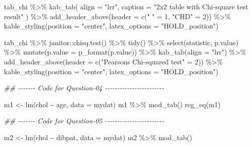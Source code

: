 \documentclass[
  12pt,
  oneside]{article}
\newenvironment{Shaded}{}{}
\newcommand{\AttributeTok}[1]{\textcolor[rgb]{0.49,0.56,0.16}{#1}}
\newcommand{\DecValTok}[1]{\textcolor[rgb]{0.25,0.63,0.44}{#1}}
\newcommand{\DocumentationTok}[1]{\textcolor[rgb]{0.73,0.13,0.13}{\textit{#1}}}
\newcommand{\FunctionTok}[1]{\textcolor[rgb]{0.02,0.16,0.49}{#1}}
\newcommand{\NormalTok}[1]{#1}
\newcommand{\OtherTok}[1]{\textcolor[rgb]{0.00,0.44,0.13}{#1}}
\newcommand{\SpecialCharTok}[1]{\textcolor[rgb]{0.25,0.44,0.63}{#1}}
\newcommand{\StringTok}[1]{\textcolor[rgb]{0.25,0.44,0.63}{#1}}
\begin{document}
\begin{Shaded}
\begin{Highlighting}[]
\NormalTok{tab\_chi }\SpecialCharTok{\%\textgreater{}\%} 
  \FunctionTok{kab\_tab}\NormalTok{(}
    \AttributeTok{align =} \StringTok{"lrr"}\NormalTok{,}
    \AttributeTok{caption =} \StringTok{"2x2 table with Chi{-}square test result"}      
\NormalTok{    ) }\SpecialCharTok{\%\textgreater{}\%} 
  \FunctionTok{add\_header\_above}\NormalTok{(}\AttributeTok{header =} \FunctionTok{c}\NormalTok{(}\StringTok{" "} \OtherTok{=} \DecValTok{1}\NormalTok{, }\StringTok{"CHD"} \OtherTok{=} \DecValTok{2}\NormalTok{)) }\SpecialCharTok{\%\textgreater{}\%} 
  \FunctionTok{kable\_styling}\NormalTok{(}\AttributeTok{position =} \StringTok{"center"}\NormalTok{, }\AttributeTok{latex\_options =} \StringTok{"HOLD\_position"}\NormalTok{)}

\NormalTok{tab\_chi }\SpecialCharTok{\%\textgreater{}\%}\NormalTok{ janitor}\SpecialCharTok{::}\FunctionTok{chisq.test}\NormalTok{() }\SpecialCharTok{\%\textgreater{}\%} 
  \FunctionTok{tidy}\NormalTok{() }\SpecialCharTok{\%\textgreater{}\%} 
  \FunctionTok{select}\NormalTok{(statistic, p.value) }\SpecialCharTok{\%\textgreater{}\%} 
  \FunctionTok{mutate}\NormalTok{(}\AttributeTok{p.value =} \FunctionTok{p\_format}\NormalTok{(p.value)) }\SpecialCharTok{\%\textgreater{}\%} 
  \FunctionTok{kab\_tab}\NormalTok{(}\AttributeTok{align =} \StringTok{"lrr"}\NormalTok{) }\SpecialCharTok{\%\textgreater{}\%} 
  \FunctionTok{add\_header\_above}\NormalTok{(}\AttributeTok{header =} \FunctionTok{c}\NormalTok{(}\StringTok{"Pearson\textquotesingle{}s Chi{-}squared test"} \OtherTok{=} \DecValTok{2}\NormalTok{)) }\SpecialCharTok{\%\textgreater{}\%} 
  \FunctionTok{kable\_styling}\NormalTok{(}\AttributeTok{position =} \StringTok{"center"}\NormalTok{, }\AttributeTok{latex\_options =} \StringTok{"HOLD\_position"}\NormalTok{)}



\DocumentationTok{\#\# {-}{-}{-}{-}{-}{-}{-} Code for Question{-}04 {-}{-}{-}{-}{-}{-}{-}{-}{-}{-}{-}{-}{-}{-}{-}{-}{-}{-}{-}{-}{-}{-}{-}{-}}

\NormalTok{m1 }\OtherTok{\textless{}{-}} \FunctionTok{lm}\NormalTok{(chol }\SpecialCharTok{\textasciitilde{}}\NormalTok{ age, }\AttributeTok{data =}\NormalTok{ mydat)}
\NormalTok{m1 }\SpecialCharTok{\%\textgreater{}\%} \FunctionTok{mod\_tab}\NormalTok{()}
\FunctionTok{reg\_eq}\NormalTok{(m1)}

\DocumentationTok{\#\# {-}{-}{-}{-}{-}{-}{-} Code for Question{-}05 {-}{-}{-}{-}{-}{-}{-}{-}{-}{-}{-}{-}{-}{-}{-}{-}{-}{-}{-}{-}{-}{-}{-}{-}}

\NormalTok{m2 }\OtherTok{\textless{}{-}} \FunctionTok{lm}\NormalTok{(chol }\SpecialCharTok{\textasciitilde{}}\NormalTok{ dibpat, }\AttributeTok{data =}\NormalTok{ mydat)}
\NormalTok{m2 }\SpecialCharTok{\%\textgreater{}\%} \FunctionTok{mod\_tab}\NormalTok{()}


\end{Highlighting}
\end{Shaded}
\end{document}
